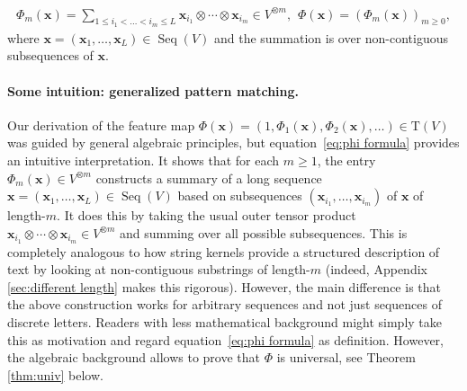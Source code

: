 \documentclass{article} \usepackage{iclr2021_conference,times}
\def\eqref#1{equation~\ref{#1}}
\newcommand{\bx}{\mathbf{x}}
\newcommand{\T}[1]{\mathrm{T}({#1})}
\newcommand{\Seq}[1]{\operatorname{Seq}(#1)}
\theoremstyle{plain}
\theoremstyle{definition}
\begin{document}
\begin{align}\label{eq:phi formula}
	\Phi_m(\bx) = \sum_{1 \leq i_1 < \dots < i_m \leq L} \bx_{i_1} \otimes \cdots \otimes \bx_{i_m} \in V^{\otimes m}, \hspace{5pt} \Phi(\bx) = (\Phi_m(\bx))_{m \geq 0},
\end{align}
where $\bx=(\bx_1, \dots, \bx_L) \in \Seq{V}$ and the summation is over non-contiguous subsequences of $\bx$. 

\paragraph{Some intuition: generalized pattern matching.}
Our derivation of the feature map $\Phi(\bx)=(1,\Phi_1(\bx), \Phi_2(\bx),\ldots) \in \T{V}$ was guided by general algebraic principles, but \eqref{eq:phi formula} provides an intuitive interpretation.
It shows that for each $m\ge 1$, the entry $\Phi_m(\bx) \in V^{\otimes m}$ constructs a summary of a long sequence $\bx=(\bx_1,\ldots,\bx_L) \in \Seq{V}$ based on subsequences $(\bx_{i_1},\ldots,\bx_{i_m})$ of $\bx$ of length-$m$.
It does this by taking the usual outer tensor product $\bx_{i_1} \otimes \cdots \otimes \bx_{i_m} \in V^{\otimes m}$ and summing over all possible subsequences.
This is completely analogous to how string kernels provide a structured description of text by looking at non-contiguous substrings of length-$m$ (indeed, Appendix \ref{sec:different length} makes this rigorous).
However, the main difference is that the above construction works for arbitrary sequences and not just sequences of discrete letters.
Readers with less mathematical background might simply take this as motivation and regard \eqref{eq:phi formula} as definition. 
However, the algebraic background allows to prove that $\Phi$ is universal, see Theorem \ref{thm:univ} below.
\end{document}
